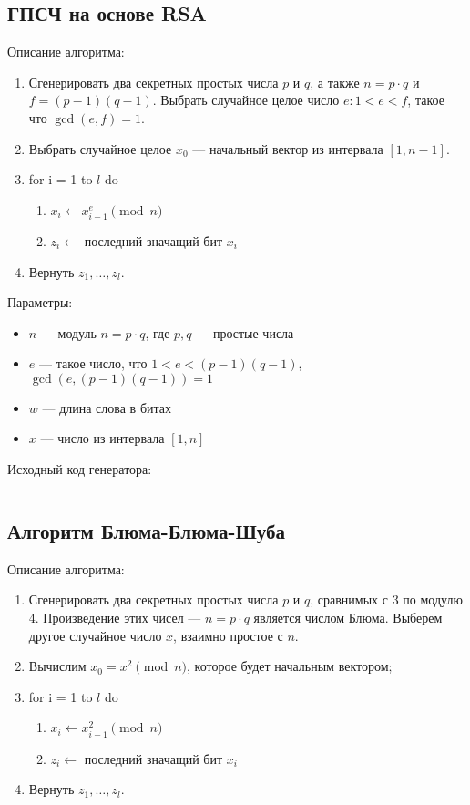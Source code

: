 \documentclass[spec, och, pract_otchet]{SCWorks}
\begin{document}
\subsection{ГПСЧ на основе RSA}

Описание алгоритма:
\begin{enumerate}
  \item
    Сгенерировать два секретных простых числа $p$ и $q$, а также $n = p \cdot q$
    и $f = (p - 1)(q - 1)$. Выбрать случайное целое число $e : 1 < e < f$, такое
    что $\gcd(e, f) = 1$.
  \item
    Выбрать случайное целое $x_0$ --- начальный вектор из интервала $[1, n -
    1]$.
  \item
    for i = 1 to $l$ do
    \begin{enumerate}
      \item $x_i \leftarrow x_{i - 1}^e \pmod{n}$
      \item $z_i \leftarrow$ последний значащий бит $x_i$
    \end{enumerate}
  \item Вернуть $z_1, \dots, z_l$.
\end{enumerate}

Параметры:
\begin{itemize}
  \item $n$ --- модуль $n = p \cdot q$, где $p, q$ --- простые числа
  \item $e$ --- такое число, что $1 < e < (p-1)(q-1)$, $\gcd(e, (p-1)(q-1)) = 1$
  \item $w$ --- длина слова в битах
  \item $x$ --- число из интервала $[1,n]$
\end{itemize}

Исходный код генератора:
\inputminted{rust}{../prng/src/rsa.rs}

\subsection{Алгоритм Блюма-Блюма-Шуба}

Описание алгоритма:
\begin{enumerate}
  \item
    Сгенерировать два секретных простых числа $p$ и $q$, сравнимых с 3 по модулю
    4. Произведение этих чисел --- $n = p \cdot q$ является числом Блюма.
    Выберем другое случайное число $x$, взаимно простое с $n$.
  \item
    Вычислим $x_0 = x^2 \pmod{n}$, которое будет начальным вектором;
  \item
    for i = 1 to $l$ do
    \begin{enumerate}
      \item $x_i \leftarrow x_{i - 1}^2 \pmod{n}$
      \item $z_i \leftarrow$ последний значащий бит $x_i$
    \end{enumerate}
  \item Вернуть $z_1, \dots, z_l$.
\end{enumerate}
\end{document}
